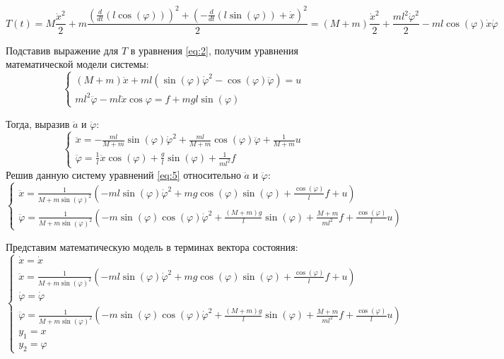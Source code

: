 \begin{equation} \label{eq:3}
  T(t) = M\frac{\dot{x}^2}{2} + m\frac{(\frac{d}{dt}(l\cos(\varphi)))^2 + (-\frac{d}{dt}(l\sin(\varphi)) + \dot{x})^2}{2}=
  (M+m)\frac{\dot{x}^2}{2} + \frac{ml^2\dot{\varphi}^2}{2} - ml\cos(\varphi)\dot{x}\dot{\varphi}
\end{equation}

Подставив выражение для $T$ в уравнения \ref{eq:2}, получим уравнения математической модели системы:
\begin{equation} \label{eq:4}
  \begin{cases}
      (M+m)\ddot{x} + ml(\sin(\varphi)\dot{\varphi}^2 - \cos(\varphi)\ddot{\varphi}) = u \\
      ml^2\ddot{\varphi} - ml\ddot{x}\cos{\varphi} = f + mgl\sin(\varphi)
  \end{cases}
\end{equation}

Тогда, выразив $\ddot{a}$ и $\ddot{\varphi}$:
\begin{equation} \label{eq:5}
  \begin{cases}
      \ddot x = -\frac{ml}{M+m}\sin(\varphi)\dot{\varphi}^2 + \frac{ml}{M+m}\cos(\varphi)\ddot{\varphi} + \frac{1}{M+m}u \\
      \ddot \varphi = \frac{1}{l}\ddot x \cos(\varphi) + \frac{g}{l}\sin(\varphi) + \frac{1}{ml^2}f
  \end{cases}
\end{equation}
Решив данную систему уравнений \ref{eq:5} относительно $\ddot a$ и $\ddot \varphi$:
\begin{equation} \label{eq:6}
  \begin{cases}
      \ddot x = \frac{1}{M + m\sin(\varphi)^2}( -ml\sin(\varphi)\dot{\varphi}^2 + mg\cos(\varphi)\sin(\varphi) + \frac{\cos(\varphi)}{l}f + u ) \\
      \ddot \varphi = \frac{1}{M + m\sin(\varphi)^2}( -m\sin(\varphi)\cos(\varphi)\dot{\varphi}^2 + \frac{(M+m)g}{l}\sin(\varphi) + \frac{M+m}{ml^2}f + \frac{\cos(\varphi)}{l}u )
  \end{cases}
\end{equation}

Представим математическую модель в терминах вектора состояния:
\begin{equation} \label{eq:7}
  \begin{cases}
      \dot x = \dot x \\
      \ddot x = \frac{1}{M + m\sin(\varphi)^2}( -ml\sin(\varphi)\dot{\varphi}^2 + mg\cos(\varphi)\sin(\varphi) + \frac{\cos(\varphi)}{l}f + u ) \\
      \dot \varphi = \dot \varphi \\
      \ddot \varphi= \frac{1}{M + m\sin(\varphi)^2}( -m\sin(\varphi)\cos(\varphi)\dot{\varphi}^2 + \frac{(M+m)g}{l}\sin(\varphi) + \frac{M+m}{ml^2}f + \frac{\cos(\varphi)}{l}u ) \\
      y_1 = x \\
      y_2 = \varphi
  \end{cases}
\end{equation}

